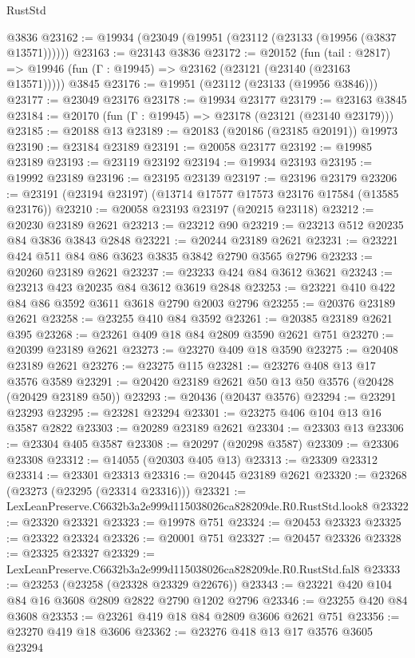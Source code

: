 \begin{lexlean}{RustStd}
\begin{coremodule}
    @3836
@23162 := @19934 (@23049 (@19951 (@23112 (@23133 (@19956 (@3837 @13571))))))
@23163 := @23143 @3836
@23172 := @20152
    (fun (tail : @2817) => @19946 (fun (Γ : @19945) => @23162 (@23121 (@23140 (@23163 @13571)))))
    @3845
@23176 := @19951 (@23112 (@23133 (@19956 @3846)))
@23177 := @23049 @23176
@23178 := @19934 @23177
@23179 := @23163 @3845
@23184 := @20170 (fun (Γ : @19945) => @23178 (@23121 (@23140 @23179)))
@23185 := @20188 @13
@23189 := @20183 (@20186 (@23185 @20191)) @19973
@23190 := @23184 @23189
@23191 := @20058 @23177
@23192 := @19985 @23189
@23193 := @23119 @23192
@23194 := @19934 @23193
@23195 := @19992 @23189
@23196 := @23195 @23139
@23197 := @23196 @23179
@23206 := @23191 (@23194 @23197) (@13714 @17577 @17573 @23176 @17584 (@13585 @23176))
@23210 := @20058 @23193 @23197 (@20215 @23118)
@23212 := @20230 @23189 @2621
@23213 := @23212 @90
@23219 := @23213 @512 @20235 @84 @3836 @3843 @2848
@23221 := @20244 @23189 @2621
@23231 := @23221 @424 @511 @84 @86 @3623 @3835 @3842 @2790 @3565 @2796
@23233 := @20260 @23189 @2621
@23237 := @23233 @424 @84 @3612 @3621
@23243 := @23213 @423 @20235 @84 @3612 @3619 @2848
@23253 := @23221 @410 @422 @84 @86 @3592 @3611 @3618 @2790 @2003 @2796
@23255 := @20376 @23189 @2621
@23258 := @23255 @410 @84 @3592
@23261 := @20385 @23189 @2621 @395
@23268 := @23261 @409 @18 @84 @2809 @3590 @2621 @751
@23270 := @20399 @23189 @2621
@23273 := @23270 @409 @18 @3590
@23275 := @20408 @23189 @2621
@23276 := @23275 @115
@23281 := @23276 @408 @13 @17 @3576 @3589
@23291 := @20420 @23189 @2621 @50 @13 @50 @3576 (@20428 (@20429 @23189 @50))
@23293 := @20436 (@20437 @3576)
@23294 := @23291 @23293
@23295 := @23281 @23294
@23301 := @23275 @406 @104 @13 @16 @3587 @2822
@23303 := @20289 @23189 @2621
@23304 := @23303 @13
@23306 := @23304 @405 @3587
@23308 := @20297 (@20298 @3587)
@23309 := @23306 @23308
@23312 := @14055 (@20303 @405 @13)
@23313 := @23309 @23312
@23314 := @23301 @23313
@23316 := @20445 @23189 @2621
@23320 := @23268 (@23273 (@23295 (@23314 @23316)))
@23321 := LexLeanPreserve.C6632b3a2e999d115038026ca828209de.R0.RustStd.look8
@23322 := @23320 @23321
@23323 := @19978 @751
@23324 := @20453 @23323
@23325 := @23322 @23324
@23326 := @20001 @751
@23327 := @20457 @23326
@23328 := @23325 @23327
@23329 := LexLeanPreserve.C6632b3a2e999d115038026ca828209de.R0.RustStd.fal8
@23333 := @23253 (@23258 (@23328 @23329 @22676))
@23343 := @23221 @420 @104 @84 @16 @3608 @2809 @2822 @2790 @1202 @2796
@23346 := @23255 @420 @84 @3608
@23353 := @23261 @419 @18 @84 @2809 @3606 @2621 @751
@23356 := @23270 @419 @18 @3606
@23362 := @23276 @418 @13 @17 @3576 @3605 @23294

\end{coremodule}
\end{lexlean}
